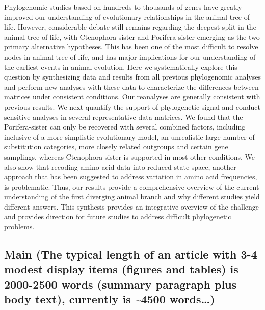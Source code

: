 \documentclass[]{article}
\begin{document}
Phylogenomic studies based on hundreds to thousands of genes have
greatly improved our understanding of evolutionary relationships in the
animal tree of life. However, considerable debate still remains
regarding the deepest split in the animal tree of life, with
Ctenophora-sister and Porifera-sister emerging as the two primary
alternative hypotheses. This has been one of the most difficult to
resolve nodes in animal tree of life, and has major implications for our
understanding of the earliest events in animal evolution. Here we
systematically explore this question by synthesizing data and results
from all previous phylogenomic analyses and perform new analyses with
these data to characterize the differences between matrices under
consistent conditions. Our reanalyses are generally consistent with
previous results. We next quantify the support of phylogenetic signal
and conduct sensitive analyses in several representative data matrices.
We found that the Porifera-sister can only be recovered with several
combined factors, including inclusive of a more simplistic evolutionary
model, an unrealistic large number of substitution categories, more
closely related outgroups and certain gene samplings, whereas
Ctenophora-sister is supported in most other conditions. We also show
that recoding amino acid data into reduced state space, another approach
that has been suggested to address variation in amino acid frequencies,
is problematic. Thus, our results provide a comprehensive overview of
the current understanding of the first diverging animal branch and why
different studies yield different answers. This synthesis provides an
integrative overview of the challenge and provides direction for future
studies to address difficult phylogenetic problems.

\hypertarget{main-the-typical-length-of-an-article-with-3-4-modest-display-items-figures-and-tables-is-2000-2500-words-summary-paragraph-plus-body-text-currently-is-4500-words}{%
\subsection{Main (The typical length of an article with 3-4 modest
display items (figures and tables) is 2000-2500 words (summary paragraph
plus body text), currently is \textasciitilde{}4500
words\ldots{})}\label{main-the-typical-length-of-an-article-with-3-4-modest-display-items-figures-and-tables-is-2000-2500-words-summary-paragraph-plus-body-text-currently-is-4500-words}}
\end{document}
